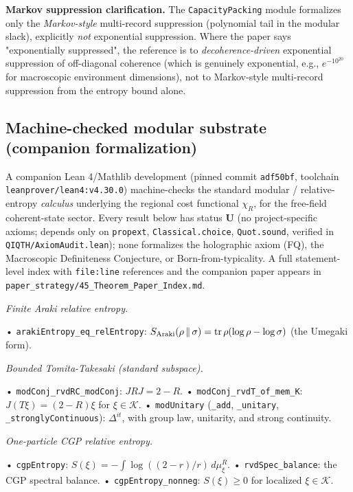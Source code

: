 \documentclass[11pt,a4paper]{article}
\begin{document}
\textbf{Markov suppression clarification.} The \texttt{CapacityPacking} module formalizes only the \emph{Markov-style} multi-record suppression (polynomial tail in the modular slack), explicitly \emph{not} exponential suppression. Where the paper says "exponentially suppressed", the reference is to \emph{decoherence-driven} exponential suppression of off-diagonal coherence (which is genuinely exponential, e.g., $e^{-10^{20}}$ for macroscopic environment dimensions), not to Markov-style multi-record suppression from the entropy bound alone.

\subsection{Machine-checked modular substrate (companion formalization)}

A companion Lean 4/Mathlib development (pinned commit \texttt{adf50bf}, toolchain \texttt{leanprover/lean4:v4.30.0}) machine-checks the standard modular / relative-entropy \emph{calculus} underlying the regional cost functional $\chi_R$, for the free-field coherent-state sector. Every result below has status \textbf{U} (no project-specific axioms; depends only on \texttt{propext}, \texttt{Classical.choice}, \texttt{Quot.sound}, verified in \texttt{QIQTH/AxiomAudit.lean}); none formalizes the holographic axiom (FQ), the Macroscopic Definiteness Conjecture, or Born-from-typicality. A full statement-level index with \texttt{file:line} references and the companion paper appears in \texttt{paper\_strategy/45\_Theorem\_Paper\_Index.md}.

\emph{Finite Araki relative entropy.}

  • \texttt{arakiEntropy\_eq\_relEntropy}: $S_{\rm Araki}(\rho\,\|\,\sigma)=\operatorname{tr}\rho(\log\rho-\log\sigma)$ (the Umegaki form).

\emph{Bounded Tomita-Takesaki (standard subspace).}

  • \texttt{modConj\_rvdRC\_modConj}: $JRJ=2-R$.
  • \texttt{modConj\_rvdT\_of\_mem\_K}: $J(T\xi)=(2-R)\xi$ for $\xi\in\mathcal{K}$.
  • \texttt{modUnitary} (\texttt{\_add}, \texttt{\_unitary}, \texttt{\_stronglyContinuous}): $\Delta^{it}$, with group law, unitarity, and strong continuity.

\emph{One-particle CGP relative entropy.}

  • \texttt{cgpEntropy}: $S(\xi)=-\int\log((2-r)/r)\,d\mu^R_\xi$.
  • \texttt{rvdSpec\_balance}: the CGP spectral balance.
  • \texttt{cgpEntropy\_nonneg}: $S(\xi)\ge 0$ for localized $\xi\in\mathcal{K}$.
\end{document}
